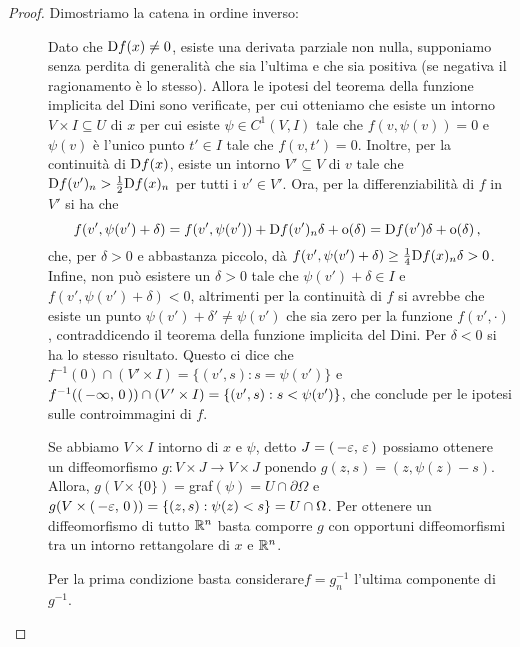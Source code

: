 \begin{proof}
	Dimostriamo la catena in ordine inverso:
	\begin{description}
		\item [] Dato che $\mathrm D f(x)\neq 0$, esiste una derivata parziale non nulla, supponiamo senza perdita di
			generalità che sia l'ultima e che sia positiva (se negativa il ragionamento è lo stesso).
			Allora le ipotesi del teorema della funzione implicita del Dini sono verificate, per cui otteniamo
			che esiste un intorno $V\times I\subseteq U$ di $x$ per cui esiste $\psi\in C^1(V,I)$ tale che $f(v,\psi(v))=0$ e $\psi(v)$
			è l'unico punto $t'\in I$ tale che $f(v,t')=0$.
			Inoltre, per la continuità di $\mathrm D f(x)$, esiste un intorno $V'\subseteq V$ di $v$ tale che $\mathrm D f(v')_n>\frac{1}{2}\mathrm D f(x)_n$ per tutti
			i $v'\in V'$. Ora, per la differenziabilità di $f$ in $V'$ si ha che
			\[
				f(v',\psi(v')+\delta)=f(v', \psi(v'))+\mathrm D f(v')_n\delta+\mathrm{o}(\delta)=\mathrm D f(v')\delta+\mathrm{o}(\delta)\, \text{, }
			\]
			che, per $\delta>0$ e abbastanza piccolo, dà $f(v',\psi(v')+\delta)\geq \frac{1}{4}\mathrm D f(x)_n\delta>0$. Infine, non può esistere un $\delta>0$ tale che $\psi(v')+\delta\in I$ e
			$f(v',\psi(v')+\delta)<0$, altrimenti per la continuità di $f$ si avrebbe che esiste un punto $\psi(v')+\delta'\neq \psi(v')$
			che sia zero per la funzione $f(v',\cdot)$, contraddicendo il teorema della funzione implicita del Dini.
			Per $\delta<0$ si ha lo stesso risultato. Questo ci dice che $f^{-1}(0)\cap (V'\times I)=\{(v',s):s=\psi(v')\}$ e
			$f^{-1}(\left(\,-\infty,\,0\,\right))\cap (V'\times I)=\{(v',s):s<\psi(v')\}$, che conclude per le ipotesi sulle controimmagini di $f$.
		\item [] Se abbiamo $V\times I$ intorno di $x$ e $\psi$, detto $J=\left(\,-\varepsilon,\,\varepsilon\,\right)$
			possiamo ottenere un diffeomorfismo $g:V\times J \rightarrow V\times J$ ponendo $g(z,s)=(z,\psi(z)-s)$. Allora,
			$g(V\times \{0\})=$graf$(\psi)=U\cap \partial \Omega$ e $g(V\times \left(\,-\varepsilon,\,0\,\right))=\{(z,s):\psi(z)<s\}=U\cap \Omega$.
			Per ottenere un diffeomorfismo di tutto $\mathbb R^n$ basta comporre $g$ con opportuni diffeomorfismi tra un intorno rettangolare
			di $x$ e $\mathbb R^n$.
		\item [] Per la prima condizione basta considerare$f=g^{-1}_n$ l'ultima componente di $g^{-1}$.
	\end{description}
\end{proof}



